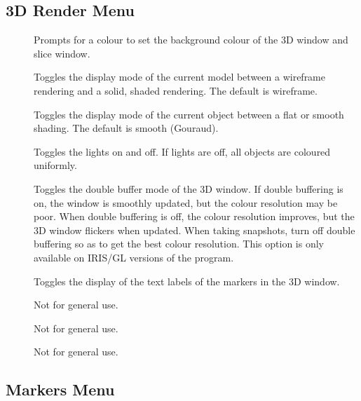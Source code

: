 \subsection{3D Render Menu}

\begin{description}
\item[]  Prompts for a colour to
        set the background colour of the 3D window and slice window.
\item[]  Toggles the display mode of the
        current model between a wireframe rendering and a solid, shaded 
        rendering.  The default is wireframe.
\item[]  Toggles the display mode of the
        current object between a flat or smooth shading.  The default is
        smooth (Gouraud).
\item[]  Toggles the lights on and off.  If lights
        are off, all objects are coloured uniformly.
\item[]  Toggles the double buffer mode of the
        3D window.  If double buffering is on, the window is smoothly
        updated, but the colour resolution may be poor.
        When double buffering is off, the colour resolution improves, but
        the 3D window flickers when updated.  When taking snapshots,
        turn off double buffering so as to get the best colour resolution.
        This option is only available on IRIS/GL versions of the program.
\item[]  Toggles the display of the text
        labels of the markers in the 3D window.
\item[]  Not for general use.
\item[]  Not for general use.
\item[]  Not for general use.
\end{description}

\subsection{Markers Menu}

